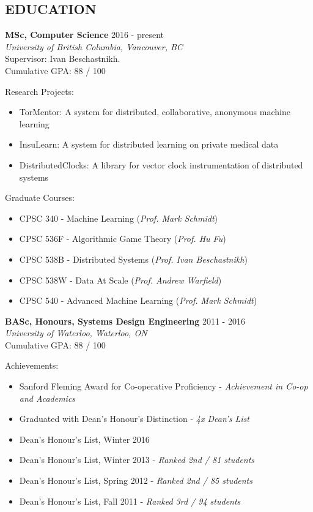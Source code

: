 \documentclass[10pt]{res} %
\begin{document}
\begin{resume}
\section{EDUCATION} 

\vspace{0.2in} %

\textbf {MSc, Computer Science} \hfill 2016 - present \\ 
{\sl University of British Columbia, Vancouver, BC} \\
Supervisor: Ivan Beschastnikh. \\
Cumulative GPA: 88 / 100

Research Projects:
\begin{itemize}   
    \item TorMentor: A system for distributed, collaborative, anonymous
    machine learning
    \item InsuLearn: A system for distributed learning on private
    medical data
    \item DistributedClocks: A library for vector clock instrumentation
    of distributed systems
\end{itemize}

Graduate Courses:
\begin{itemize} 
    \item CPSC 340 - Machine Learning (\emph{Prof. Mark Schmidt})
    \item CPSC 536F - Algorithmic Game Theory (\emph{Prof. Hu Fu})
    \item CPSC 538B - Distributed Systems (\emph{Prof. Ivan
    Beschastnikh})
    \item CPSC 538W - Data At Scale (\emph{Prof. Andrew Warfield})
    \item CPSC 540 - Advanced Machine Learning (\emph{Prof. Mark
    Schmidt})
\end{itemize}

\textbf {BASc, Honours, Systems Design Engineering} \hfill 2011 - 2016 \\ 
{\sl University of Waterloo, Waterloo, ON} \\
Cumulative GPA: 88 / 100

Achievements:
\begin{itemize} 
    \item Sanford Fleming Award for Co-operative Proficiency - {\sl
    Achievement in Co-op and Academics}
    \item Graduated with Dean's Honour's Distinction - {\sl 4x Dean's
    List}
    \item Dean's Honour's List, Winter 2016
    \item Dean's Honour's List, Winter 2013 - {\sl Ranked 2nd / 81
    students}
    \item Dean's Honour's List, Spring 2012 - {\sl Ranked 2nd / 85 students}
    \item Dean's Honour's List, Fall 2011 - {\sl Ranked 3rd / 94 students}
\end{itemize}


\end{resume}
\end{document}
